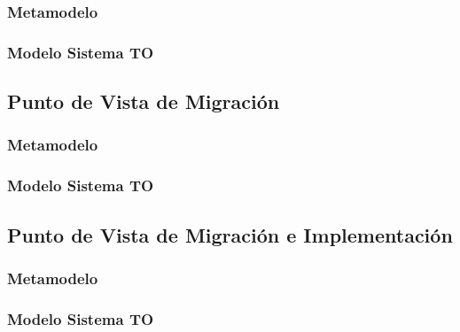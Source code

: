 		\subsubsection{Metamodelo}
		\subsubsection{Modelo Sistema TO}
    \subsection{Punto de Vista de Migración}
		\subsubsection{Metamodelo}
		\subsubsection{Modelo Sistema TO}
    \subsection{Punto de Vista de Migración e Implementación}
		\subsubsection{Metamodelo}
		\subsubsection{Modelo Sistema TO}